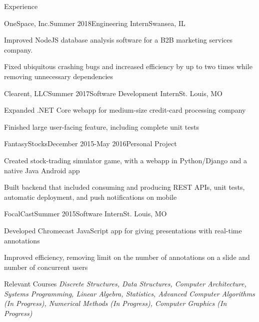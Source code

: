 \documentclass{resume} %
\begin{document}
            \begin{rSection}{Experience}
                \begin{rSubsection}{OneSpace, Inc.}{Summer 2018}{Engineering Intern}{Swansea, IL}
                \item Improved NodeJS database analysis software for a B2B marketing services company. 
                \item Fixed ubiquitous crashing bugs and increased efficiency by up to two times while removing unnecessary dependencies
                \end{rSubsection}


                \begin{rSubsection}{Clearent, LLC}{Summer 2017}{Software Development Intern}{St. Louis, MO}
                \item Expanded .NET Core webapp for medium-size credit-card processing company
                \item Finished large user-facing feature, including complete unit tests
                \end{rSubsection}

                \begin{rSubsection}{FantasyStocks}{December 2015-May 2016}{Personal Project}{}
                \item Created stock-trading simulator game, with a webapp in Python/Django and a native Java Android app
                \item Built backend that included consuming and producing REST APIs, unit tests, automatic deployment, and push notifications on mobile
                \end{rSubsection}


                \begin{rSubsection}{FocalCast}{Summer 2015}{Software Intern}{St. Louis, MO}{}
                \item Developed Chromecast JavaScript app for giving presentations with real-time annotations
                \item Improved efficiency, removing limit on the number of annotations on a slide and number of concurrent users
                \end{rSubsection}

            \end{rSection}


    \begin{rSection}{Relevant Courses}
        \textit{Discrete Structures, Data Structures, Computer Architecture, Systems Programming, Linear Algebra, Statistics, Advanced Computer Algorithms (In Progress), Numerical Methods (In Progress), Computer Graphics (In Progress)}

    \end{rSection}
\end{document}
